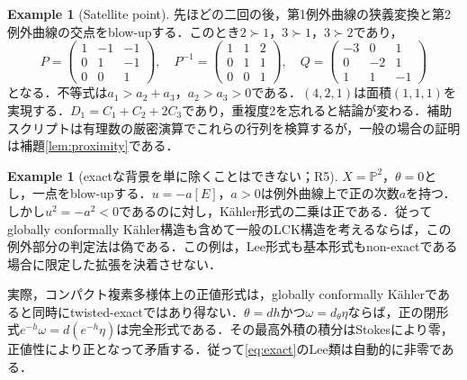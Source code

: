 \documentclass[12pt]{amsart}
\theoremstyle{definition}
\newtheorem{eg}[thm]{Example}
\theoremstyle{remark}
\numberwithin{equation}{section}
\newcommand{\mP}{\mathbb{P}}
\begin{document}
\begin{eg}[Satellite point]\label{ex:satellite}
先ほどの二回の後，第1例外曲線の狭義変換と第2例外曲線の交点をblow-upする．このとき$2\succ1$，$3\succ1$，$3\succ2$であり，
\begin{equation}\label{eq:satellite}
 P=\begin{pmatrix}1&-1&-1\\0&1&-1\\0&0&1\end{pmatrix},\quad
 P^{-1}=\begin{pmatrix}1&1&2\\0&1&1\\0&0&1\end{pmatrix},\quad
 Q=\begin{pmatrix}-3&0&1\\0&-2&1\\1&1&-1\end{pmatrix}
\end{equation}
となる．不等式は$a_1>a_2+a_3$，$a_2>a_3>0$である．$(4,2,1)$は面積$(1,1,1)$を実現する．$D_1=C_1+C_2+2C_3$であり，重複度2を忘れると結論が変わる．補助スクリプトは有理数の厳密演算でこれらの行列を検算するが，一般の場合の証明は補題\ref{lem:proximity}である．
\end{eg}

\begin{eg}[exactな背景を単に除くことはできない；R5]\label{ex:kahler}
$X=\mP^2$，$\theta=0$とし，一点をblow-upする．$u=-a[E]$，$a>0$は例外曲線上で正の次数$a$を持つ．しかし$u^2=-a^2<0$であるのに対し，K\"ahler形式の二乗は正である．従ってglobally conformally K\"ahler構造も含めて一般のLCK構造を考えるならば，この例外部分の判定法は偽である．この例は，Lee形式も基本形式もnon-exactである場合に限定した拡張を決着させない．

実際，コンパクト複素多様体上の正値形式は，globally conformally K\"ahlerであると同時にtwisted-exactではあり得ない．$\theta=dh$かつ$\omega=d_\theta\eta$ならば，正の閉形式$e^{-h}\omega=d(e^{-h}\eta)$は完全形式である．その最高外積の積分はStokesにより零，正値性により正となって矛盾する．従って\eqref{eq:exact}のLee類は自動的に非零である．
\end{eg}
\end{document}
